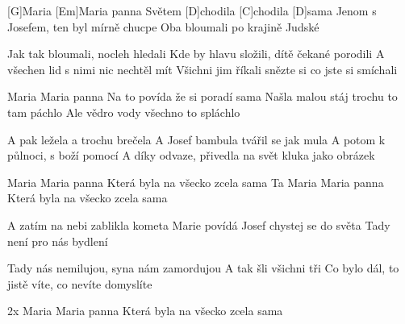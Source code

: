 
[G]Maria [Em]Maria panna
Světem [D]chodila [C]chodila [D]sama
Jenom s Josefem, ten byl mírně chucpe
Oba bloumali po krajině Judské

Jak tak bloumali, nocleh hledali
Kde by hlavu složili, dítě čekané porodili
A všechen lid s nimi nic nechtěl mít
Všichni jim říkali snězte si co jste si smíchali

Maria Maria panna
Na to povída že si poradí sama
Našla malou stáj trochu to tam páchlo
Ale vědro vody všechno to spláchlo

A pak ležela a trochu brečela
A Josef bambula tvářil se jak mula
A potom k půlnoci, s boží pomocí
A díky odvaze, přivedla na svět kluka jako obrázek

Maria Maria panna
Která byla na všecko zcela sama
Ta Maria Maria panna
Která byla na všecko zcela sama

A zatím na nebi zablikla kometa
Marie povídá Josef chystej se do světa
Tady není pro nás bydlení

Tady nás nemilujou, syna nám zamordujou
A tak šli všichni tři
Co bylo dál, to jistě víte, co nevíte domyslíte

2x Maria Maria panna
Která byla na všecko zcela sama
\slpc